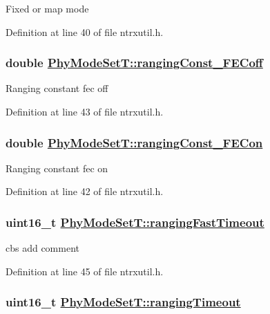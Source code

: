 Fixed or map mode 

Definition at line 40 of file ntrxutil.h.\hypertarget{structPhyModeSetT_ee565cfc56fe5487c8f29ec9c3312bfe}{
\subsubsection[rangingConst\_\-FECoff]{\setlength{\rightskip}{0pt plus 5cm}double \hyperlink{structPhyModeSetT_ee565cfc56fe5487c8f29ec9c3312bfe}{Phy\-Mode\-Set\-T::ranging\-Const\_\-FECoff}}}
\label{structPhyModeSetT_ee565cfc56fe5487c8f29ec9c3312bfe}


Ranging constant fec off 

Definition at line 43 of file ntrxutil.h.\hypertarget{structPhyModeSetT_0cf73098ea3b84402bb7a04f4f86411d}{
\subsubsection[rangingConst\_\-FECon]{\setlength{\rightskip}{0pt plus 5cm}double \hyperlink{structPhyModeSetT_0cf73098ea3b84402bb7a04f4f86411d}{Phy\-Mode\-Set\-T::ranging\-Const\_\-FECon}}}
\label{structPhyModeSetT_0cf73098ea3b84402bb7a04f4f86411d}


Ranging constant fec on 

Definition at line 42 of file ntrxutil.h.\hypertarget{structPhyModeSetT_73866d2c804bd7b5c89a4c750431e451}{
\subsubsection[rangingFastTimeout]{\setlength{\rightskip}{0pt plus 5cm}uint16\_\-t \hyperlink{structPhyModeSetT_73866d2c804bd7b5c89a4c750431e451}{Phy\-Mode\-Set\-T::ranging\-Fast\-Timeout}}}
\label{structPhyModeSetT_73866d2c804bd7b5c89a4c750431e451}


cbs add comment 

Definition at line 45 of file ntrxutil.h.\hypertarget{structPhyModeSetT_00eb02515b60998c69e02156319fccea}{
\subsubsection[rangingTimeout]{\setlength{\rightskip}{0pt plus 5cm}uint16\_\-t \hyperlink{structPhyModeSetT_00eb02515b60998c69e02156319fccea}{Phy\-Mode\-Set\-T::ranging\-Timeout}}}
\label{structPhyModeSetT_00eb02515b60998c69e02156319fccea}


